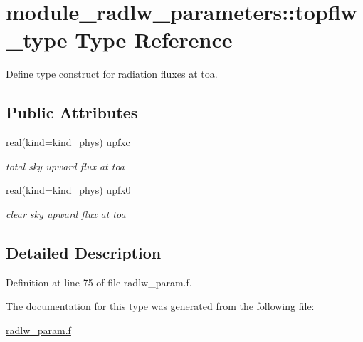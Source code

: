 \hypertarget{structmodule__radlw__parameters_1_1topflw__type}{}\section{module\+\_\+radlw\+\_\+parameters\+:\+:topflw\+\_\+type Type Reference}
\label{structmodule__radlw__parameters_1_1topflw__type}


Define type construct for radiation fluxes at toa.  


\subsection*{Public Attributes}
\textbf{ }\par
\begin{DoxyCompactItemize}
\item 
\mbox{\label{structmodule__radlw__parameters_1_1topflw__type_a19ff2669a279a1db869766c0e3d88981}} 
real(kind=kind\+\_\+phys) \hyperlink{structmodule__radlw__parameters_1_1topflw__type_a19ff2669a279a1db869766c0e3d88981}{upfxc}
\begin{DoxyCompactList}\small\item\em total sky upward flux at toa \end{DoxyCompactList}\item 
\mbox{\label{structmodule__radlw__parameters_1_1topflw__type_a7080fda1f732474077aeb302b57351cb}} 
real(kind=kind\+\_\+phys) \hyperlink{structmodule__radlw__parameters_1_1topflw__type_a7080fda1f732474077aeb302b57351cb}{upfx0}
\begin{DoxyCompactList}\small\item\em clear sky upward flux at toa \end{DoxyCompactList}\end{DoxyCompactItemize}



\subsection{Detailed Description}


Definition at line 75 of file radlw\+\_\+param.\+f.



The documentation for this type was generated from the following file\+:\begin{DoxyCompactItemize}
\item 
\hyperlink{radlw__param_8f}{radlw\+\_\+param.\+f}\end{DoxyCompactItemize}
